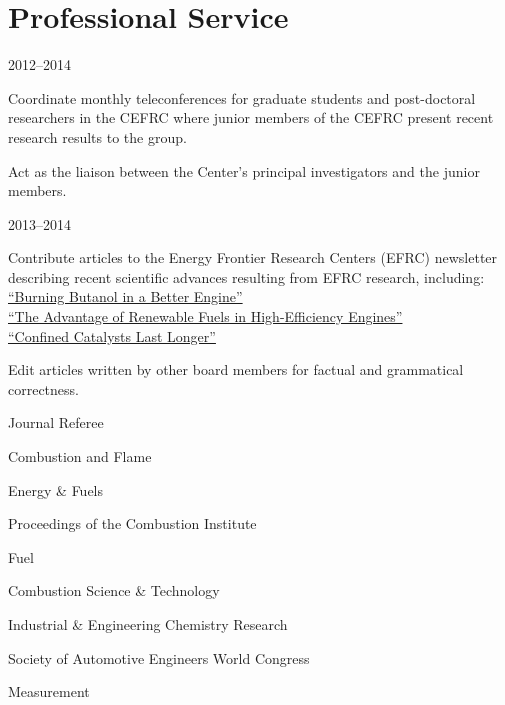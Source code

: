 \section{{\sectionfont Professional Service}}

\begin{lonelist}
\item[]  \hfill 2012--2014\\

\begin{innerlist}
\item Coordinate monthly teleconferences for graduate students
and post-doctoral researchers in the CEFRC where junior members of
the CEFRC present recent research results to the group.
\item Act as the liaison between the Center's principal investigators
and the junior members.
\end{innerlist}

\item[]  \hfill 2013--2014\\

\begin{innerlist}
\item Contribute articles to the Energy Frontier Research Centers (EFRC)
newsletter describing recent scientific advances resulting from
EFRC research, including:\\
\hspace*{0.25in}\href{http://www.energyfrontier.us/newsletter/201210/burning-butanol-better-engine}
{``Burning Butanol in a Better Engine''}\\
\hspace*{0.25in}\href{http://www.energyfrontier.us/newsletter/201401/advantage-renewable-fuels-high-efficiency-engines}
{``The Advantage of Renewable Fuels in High-Efficiency Engines''}\\
\hspace*{0.25in}\href{http://www.energyfrontier.us/newsletter/201404/confined-catalysts-last-longer}
{``Confined Catalysts Last Longer''}
\item Edit articles written by other board members for factual and grammatical correctness.
\end{innerlist}

\item[] Journal Referee
   \begin{innerlist}
       \item Combustion and Flame
       \item Energy \& Fuels
       \item Proceedings of the Combustion Institute
       \item Fuel
       \item Combustion Science \& Technology
       \item Industrial \& Engineering Chemistry Research
       \item Society of Automotive Engineers World Congress
       \item Measurement
   \end{innerlist}


\end{lonelist}
